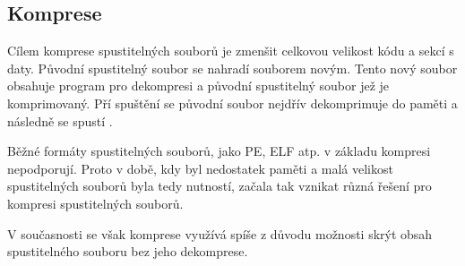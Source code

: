 \subsection{Komprese}

Cílem komprese spustitelných souborů je zmenšit celkovou velikost kódu a sekcí s daty. Původní spustitelný soubor se nahradí souborem novým. Tento nový soubor obsahuje program pro dekompresi a původní spustitelný soubor jež je komprimovaný.  Pří spuštění se původní soubor nejdřív dekomprimuje do paměti a následně se spustí \cite{golchikov_2002}.

Běžné formáty spustitelných souborů, jako PE, ELF atp. v základu kompresi nepodporují. Proto v době, kdy byl nedostatek paměti a malá velikost spustitelných souborů byla tedy nutností, začala tak vznikat různá řešení pro kompresi spustitelných souborů.

V současnosti se však komprese využívá spíše z důvodu možnosti skrýt obsah spustitelného souboru bez jeho dekomprese.



